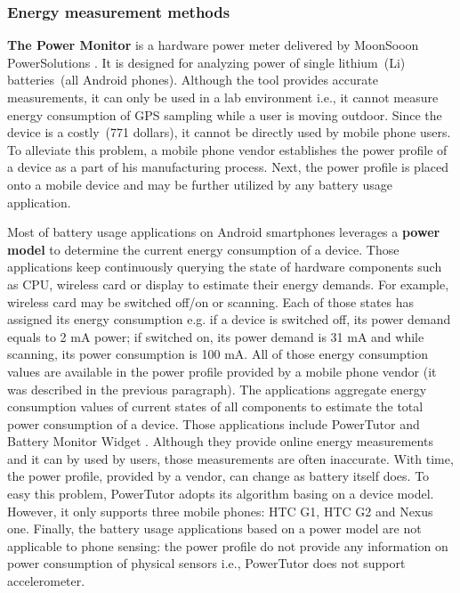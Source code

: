 \subsubsection{Energy measurement methods}
\hspace{10pt} \textbf{The Power Monitor} is a hardware power meter delivered by MoonSooon PowerSolutions \cite{monsoon:powermonitor}.  It is designed for analyzing power of single lithium\ (Li) batteries\ (all Android phones). Although the tool provides accurate measurements, it can only be used in a lab environment i.e., it cannot measure energy consumption of GPS sampling while a user is moving outdoor. Since the device is a costly\ (771 dollars), it cannot be directly used by mobile phone users. To alleviate this problem, a mobile phone vendor establishes the power profile of a device as a part of his manufacturing process. Next, the power profile is placed onto a mobile device \cite{android:powerprofiles} and may be further utilized by any battery usage application.

Most of battery usage applications on Android smartphones leverages a \textbf{power model} to determine the current energy consumption of a device. Those applications keep continuously querying the state of hardware components such as CPU, wireless card or display to estimate their energy demands. For example, wireless card may be switched off/on or scanning. Each of those states has assigned its energy consumption e.g. if a device is switched off, its power demand equals to 2 mA power; if switched on, its power demand is 31 mA and while scanning, its power consumption is 100 mA. All of those energy consumption values are available in the power profile provided by a mobile phone vendor (it was described in the previous paragraph). The applications aggregate energy consumption values of current states of all components to estimate the total power consumption of a device. Those applications include PowerTutor \cite{zhang:powertutor} and Battery Monitor Widget \cite{googleplay:batterymonitorwidget}. Although they provide online energy measurements and it can by used by users, those measurements are often inaccurate. With time, the power profile, provided by a vendor, can change as battery itself does. To easy this problem, PowerTutor adopts its algorithm basing on a device model. However, it only supports three mobile phones: HTC G1, HTC G2 and Nexus one. Finally, the battery usage applications based on a power model are not applicable to phone sensing: the power profile do not provide any information on power consumption of physical sensors i.e., PowerTutor does not support accelerometer.

